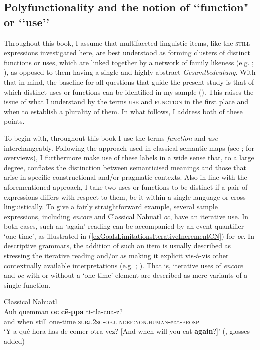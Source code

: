 \subsection{Polyfunctionality and the notion of \lq\lq function" or \lq\lq use\rq\rq}
\label{sectionDistinctiveness}
Throughout this book, I assume that multifaceted linguistic items, like the \textsc{still} expressions investigated here, are best understood as forming clusters of distinct functions or uses, which are linked together by a network of family likeness (e.g. \cite[ch. 4]{Haspelmath1997}; \cite{Janda2015}), as opposed to them having a single and highly abstract \textit{Gesamtbedeutung}. With that in mind, the baseline for all questions that guide the present study is that of which distinct  uses or functions can be identified in my sample (). This raises the issue of what I understand by the terms \textsc{use} and \textsc{function} in the first place and when to establish a plurality of them. In what follows, I address both of these points.

To begin with, throughout this book I use the terms \textit{function} and \textit{use }interchangeably. Following the approach used in classical semantic maps (see \cite{GeorgakopulosPolis2008}; \cite{Haspelmath2003} for overviews), I furthermore make use of these labels in a wide sense that, to a large degree, conflates the distinction between semanticised meanings and those that arise in specific constructional and/or pragmatic contexts. Also in line with the aforementioned approach, I take two uses or functions to be distinct if a pair of expressions differs with respect to them, be it within a single language or cross-linguistically. To give a fairly straightforward example, several sample expressions, including  \textit{encore} and Classical Nahuatl \textit{oc}, have an iterative use. In both cases, such an \lq again\rq{ }reading can be accompanied by an event quantifier \lq one time', as illustrated in (\ref{exGoalsLimitationsIterativeIncrementCN}) for \textit{oc}. In descriptive grammars, the addition of such an item is usually described as stressing the iterative reading and/or as making it explicit vis-à-vis other contextually available interpretations (e.g. \cite[535]{BatchelorChebliSaadi2011}; \cite[1265]{Launey1986}). That is, iterative uses of \textit{encore} and \textit{oc} with or without a \lq one time\rq{ }element are described as mere variants of a single function.

\begin{exe}
	\ex Classical Nahuatl\label{exGoalsLimitationsIterativeIncrementCN}\\
	\gll Auh quēmman \textbf{oc} \textbf{cē}-\textbf{ppa} ti-tla-cuā-z?\\
	and when still one-time \textsc{subj}.2\textsc{sg}-\textsc{obj}.\textsc{indef}:\textsc{non}.\textsc{human}-eat-\textsc{prosp}\\
	\glt \lq Y a qué hora has de comer otra vez? [And when will you eat \textbf{again}?]' (\cite[505]{Carochi1645}, glosses added)
\end{exe}

